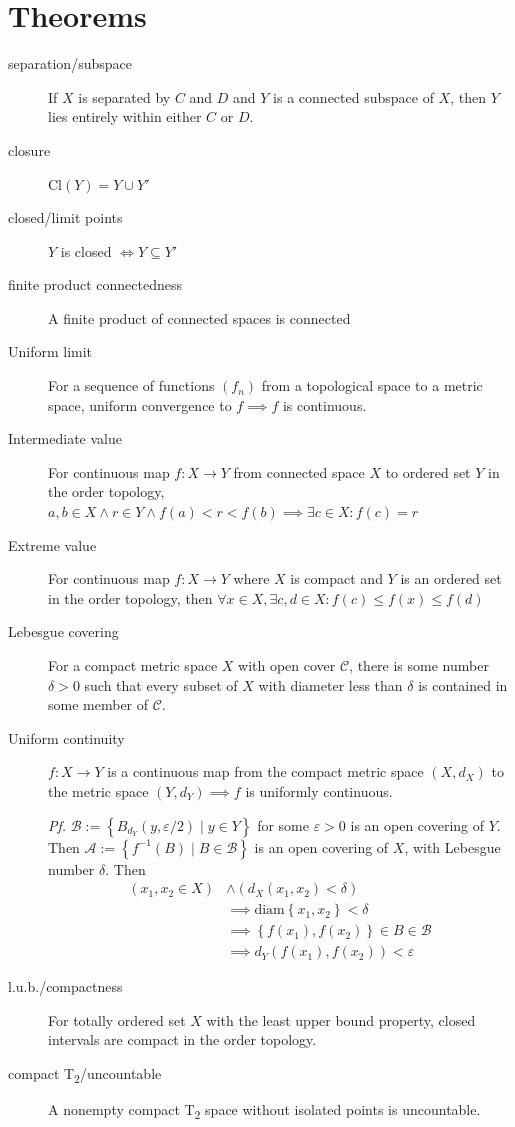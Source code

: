 \documentclass[tbtags,columns=2]{cheatsheet}
\begin{document}
\section{Theorems}
\begin{description}
    \item[separation/subspace] If $X$ is separated by $C$ and $D$ and $Y$ is a connected subspace of $X$, then $Y$ lies entirely within either $C$ or $D$.
    \item[closure] $\mathrm{Cl}(Y)=Y\cup Y'$
    \item[closed/limit points] $Y$ is closed $\iff Y \subseteq Y'$
    \item[finite product connectedness] A finite product of connected spaces is connected
    \item[Uniform limit] For a sequence of functions $\left( f_n \right)$ from a topological space to a metric space, uniform convergence to $f \implies f$ is continuous.
    \item[Intermediate value] For continuous map $f:X\to Y$ from connected space $X$ to ordered set $Y$ in the order topology, $a,b\in X \land r\in Y \land f(a) < r < f(b) \implies \exists c\in X : f(c)=r$
    \item[Extreme value] For continuous map $f:X\to Y$ where $X$ is compact and $Y$ is an ordered set in the order topology, then $\forall x\in X, \exists c,d\in X : f(c) \leq f(x) \leq f(d)$
    \item[Lebesgue covering] For a compact metric space $X$ with open cover $\mathcal{C}$, there is some number $\delta > 0$ such that every subset of $X$ with diameter less than $\delta$ is contained in some member of $\mathcal{C}$.
    \item[Uniform continuity] $f:X\to Y$ is a continuous map from the compact metric space $\left( X, d_X \right)$ to the metric space $\left( Y, d_Y \right) \implies f$ is uniformly continuous.

    \emph{Pf.} $\mathcal{B}:=\left\{B_{d_Y}( y, \varepsilon/2) \mid y \in Y  \right\}$ for some $\varepsilon>0$ is an open covering of $Y$. Then $\mathcal{A} := \left\{ f^{-1}(B) \mid B \in \mathcal{B} \right\}$ is an open covering of $X$, with Lebesgue number $\delta$. Then $$\begin{aligned}
        \left( x_1, x_2 \in X \right) &\land \left( d_X(x_1,x_2)<\delta \right) \\
        &\implies \mathrm{diam}\left\{ x_1,x_2 \right\}<\delta \\
        &\implies \left\{ f(x_1), f(x_2)\right\} \in B \in \mathcal{B} \\
        &\implies d_Y(f(x_1),f(x_2))<\varepsilon
    \end{aligned}$$
    \item[l.u.b./compactness] For totally ordered set $X$ with the least upper bound property, closed intervals are compact in the order topology.
    \item[compact T\textsubscript{2}/uncountable] A nonempty compact T\textsubscript{2} space without isolated points is uncountable.
\end{description}
\end{document}
